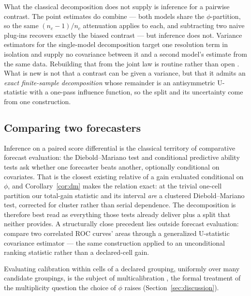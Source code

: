 What the classical decomposition does not supply is inference for a pairwise contrast. The
point estimates do combine --- both models share the $\phi$-partition, so the same
$(n_c-1)/n_c$ attenuation applies to each, and subtracting two naive plug-ins recovers
exactly the biased contrast --- but inference does not. Variance estimators for the
single-model decomposition \citep{siegert2014variance} target one resolution term in
isolation and supply no covariance between it and a second model's estimate from the same
data. Rebuilding that from the joint law is routine rather than open
\citep{ferro2007comparing,delong1988comparing}. What is new is not that a contrast can be
given a variance, but that it admits an \emph{exact finite-sample decomposition} whose
remainder is an antisymmetric U-statistic with a one-pass influence function, so the split
and its uncertainty come from one construction.

\subsection{Comparing two forecasters}\label{sec:related-dm}

Inference on a paired score differential is the classical territory of comparative
forecast evaluation: the Diebold--Mariano test \citep{diebold1995comparing} and
conditional predictive ability tests \citep{giacomini2006tests} ask whether one forecaster
beats another, optionally conditional on covariates. That is the closest existing relative
of a gain evaluated conditional on $\phi$, and
Corollary~\ref{cor:dm} makes the relation exact: at the trivial one-cell partition our
total-gain statistic and its interval \emph{are} a clustered Diebold--Mariano test,
corrected for cluster rather than serial dependence. The decomposition is therefore best
read as everything those tests already deliver plus a split that neither provides. A structurally close precedent lies outside forecast evaluation:
\citet{delong1988comparing} compare two correlated ROC curves' areas through a generalized
U-statistic covariance estimator --- the same construction applied to an unconditional
ranking statistic rather than a declared-cell gain.

Evaluating calibration within cells of a declared grouping, uniformly over many candidate
groupings, is the subject of multicalibration \citep{hebert2018multicalibration}, the formal
treatment of the multiplicity question the choice of $\phi$ raises
(Section~\ref{sec:discussion}).

